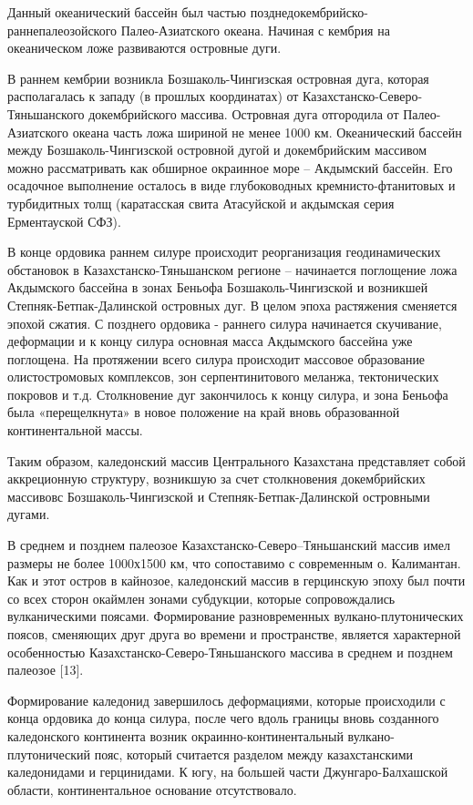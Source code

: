 Данный океанический бассейн был частью позднедокембрийско-
раннепалеозойского Палео-Азиатского океана. Начиная с кембрия на
океаническом ложе развиваются островные дуги.

В раннем кембрии возникла Бозшаколь-Чингизская островная дуга, которая
располагалась к западу (в прошлых координатах) от
Казахстанско-Северо-Тяньшанского докембрийского массива. Островная дуга
отгородила от Палео-Азиатского океана часть ложа шириной не менее 1000
км. Океанический бассейн между Бозшаколь-Чингизской островной дугой и
докембрийским массивом можно рассматривать как обширное окраинное море
-- Акдымский бассейн. Его осадочное выполнение осталось в виде
глубоководных кремнисто-фтанитовых и турбидитных толщ (каратасская свита
Атасуйской и акдымская серия Ерментауской СФЗ).

В конце ордовика раннем силуре происходит реорганизация геодинамических
обстановок в Казахстанско-Тяньшанском регионе -- начинается поглощение
ложа Акдымского бассейна в зонах Беньофа Бозшаколь-Чингизской и
возникшей Степняк-Бетпак-Далинской островных дуг. В целом эпоха
растяжения сменяется эпохой сжатия. С позднего ордовика - раннего силура
начинается скучивание, деформации и к концу силура основная масса
Акдымского бассейна уже поглощена. На протяжении всего силура происходит
массовое образование олистостромовых комплексов, зон серпентинитового
меланжа, тектонических покровов и т.д. Столкновение дуг закончилось к
концу силура, и зона Беньофа была «перещелкнута» в новое положение на
край вновь образованной континентальной массы.

Таким образом, каледонский массив Центрального Казахстана представляет
собой аккреционную структуру, возникшую за счет столкновения
докембрийских массивовс Бозшаколь-Чингизской и Степняк-Бетпак-Далинской
островными дугами.

В среднем и позднем палеозое Казахстанско-Северо--Тяньшанский массив
имел размеры не более 1000х1500 км, что сопоставимо с современным о.
Калимантан. Как и этот остров в кайнозое, каледонский массив в
герцинскую эпоху был почти со всех сторон окаймлен зонами субдукции,
которые сопровождались вулканическими поясами. Формирование
разновременных вулкано-плутонических поясов, сменяющих друг друга во
времени и пространстве, является характерной особенностью
Казахстанско-Северо-Тяньшанского массива в среднем и позднем палеозое
{[}13{]}.

Формирование каледонид завершилось деформациями, которые происходили с
конца ордовика до конца силура, после чего вдоль границы вновь
созданного каледонского континента возник окраинно-континентальный
вулкано-плутонический пояс, который считается разделом между
казахстанскими каледонидами и герцинидами. К югу, на большей части
Джунгаро-Балхашской области, континентальное основание отсутствовало.

